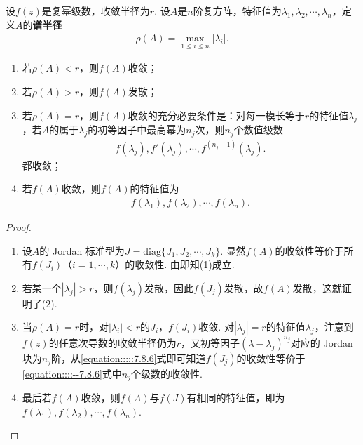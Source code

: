 \documentclass[../../main.tex]{subfiles}%
\begin{document}
\begin{theorem}\label{theorem:复方阵幂级数的谱半径}
设\(f(z)\)是复幂级数，收敛半径为\(r\). 设\(A\)是\(n\)阶复方阵，特征值为\(\lambda_1,\lambda_2,\cdots,\lambda_n\)，定义\(A\)的\textbf{谱半径}
\begin{align*}
\rho(A) = \max_{1 \leqslant  i \leqslant  n}|\lambda_i|.
\end{align*}
\begin{enumerate}[(1)]
\item 若\(\rho(A) < r\)，则\(f(A)\)收敛；

\item 若\(\rho(A) > r\)，则\(f(A)\)发散；

\item 若\(\rho(A) = r\)，则\(f(A)\)收敛的充分必要条件是：对每一模长等于\(r\)的特征值\(\lambda_j\)，若\(A\)的属于\(\lambda_j\)的初等因子中最高幂为\(n_j\)次，则\(n_j\)个数值级数
\begin{align}
f(\lambda_j), f'(\lambda_j), \cdots, f^{(n_j - 1)}(\lambda_j) .\label{equation::::--7.8.6}
\end{align}
都收敛；

\item 若\(f(A)\)收敛，则\(f(A)\)的特征值为
\begin{align*}
f(\lambda_1), f(\lambda_2), \cdots, f(\lambda_n).
\end{align*} 
\end{enumerate}
\end{theorem}
\begin{proof}
\begin{enumerate}[(1)]
\item 设\(A\)的 Jordan 标准型为\(J = \mathrm{diag}\{J_1,J_2,\cdots,J_k\}\). 显然\(f(A)\)的收敛性等价于所有\(f(J_i)\)（\(i = 1,\cdots,k\)）的收敛性. 由即知(1)成立.

\item 若某一个\(|\lambda_j| > r\)，则\(f(\lambda_j)\)发散，因此\(f(J_j)\)发散，故\(f(A)\)发散，这就证明了(2).

\item 当\(\rho(A) = r\)时，对\(|\lambda_i| < r\)的\(J_i\)，\(f(J_i)\)收敛. 对\(|\lambda_j| = r\)的特征值\(\lambda_j\)，注意到\(f(z)\)的任意次导数的收敛半径仍为\(r\)，又初等因子\((\lambda - \lambda_j)^{n_j}\)对应的 Jordan 块为\(n_j\)阶，从\eqref{equation:::::7.8.6}式即可知道\(f(J_j)\)的收敛性等价于\eqref{equation::::--7.8.6}式中\(n_j\)个级数的收敛性.

\item 最后若\(f(A)\)收敛，则\(f(A)\)与\(f(J)\)有相同的特征值，即为\(f(\lambda_1),f(\lambda_2),\cdots,f(\lambda_n)\).
\end{enumerate}

\end{proof}
\end{document}
